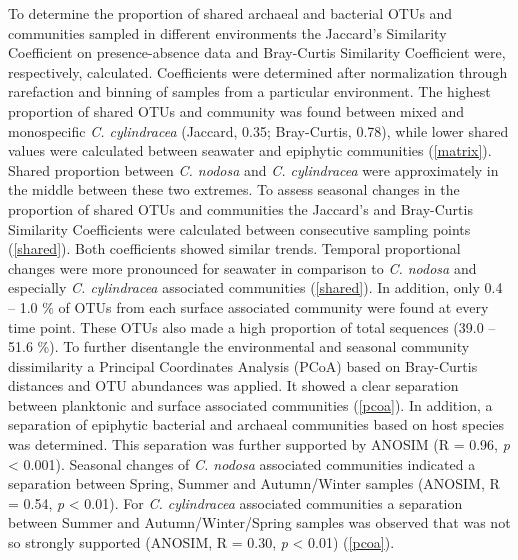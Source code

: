 \documentclass[12pt,]{article}
\begin{document}
To determine the proportion of shared archaeal and bacterial OTUs and
communities sampled in different environments the Jaccard's Similarity
Coefficient on presence-absence data and Bray-Curtis Similarity
Coefficient were, respectively, calculated. Coefficients were determined
after normalization through rarefaction and binning of samples from a
particular environment. The highest proportion of shared OTUs and
community was found between mixed and monospecific \emph{C. cylindracea}
(Jaccard, 0.35; Bray-Curtis, 0.78), while lower shared values were
calculated between seawater and epiphytic communities
(\autoref{matrix}). Shared proportion between \emph{C. nodosa} and
\emph{C. cylindracea} were approximately in the middle between these two
extremes. To assess seasonal changes in the proportion of shared OTUs
and communities the Jaccard's and Bray-Curtis Similarity Coefficients
were calculated between consecutive sampling points (\autoref{shared}).
Both coefficients showed similar trends. Temporal proportional changes
were more pronounced for seawater in comparison to \emph{C. nodosa} and
especially \emph{C. cylindracea} associated communities
(\autoref{shared}). In addition, only 0.4 -- 1.0 \si{\percent} of OTUs
from each surface associated community were found at every time point.
These OTUs also made a high proportion of total sequences (39.0 -- 51.6
\si{\percent}). To further disentangle the environmental and seasonal
community dissimilarity a Principal Coordinates Analysis (PCoA) based on
Bray-Curtis distances and OTU abundances was applied. It showed a clear
separation between planktonic and surface associated communities
(\autoref{pcoa}). In addition, a separation of epiphytic bacterial and
archaeal communities based on host species was determined. This
separation was further supported by ANOSIM (R = 0.96, \emph{p}
\textless{} 0.001). Seasonal changes of \emph{C. nodosa} associated
communities indicated a separation between Spring, Summer and
Autumn/Winter samples (ANOSIM, R = 0.54, \emph{p} \textless{} 0.01). For
\emph{C. cylindracea} associated communities a separation between Summer
and Autumn/Winter/Spring samples was observed that was not so strongly
supported (ANOSIM, R = 0.30, \emph{p} \textless{} 0.01)
(\autoref{pcoa}).
\end{document}
